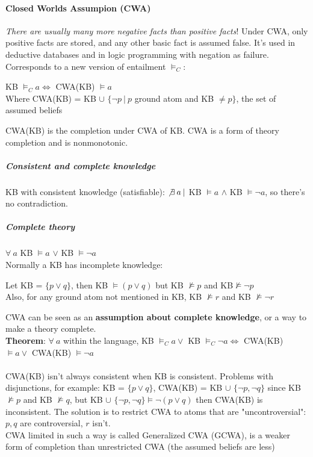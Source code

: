 \documentclass[10pt]{report}
\begin{document}
\paragraph{Closed Worlds Assumpion (CWA)} \textit{There are usually many more negative facts than positive facts}! Under CWA, only positive facts are stored, and any other basic fact is assumed false. It's used in deductive databases and in logic programming with negation as failure. Corresponds to a new version of entailment $\vDash_C$:
\begin{list}{}{}
	\item KB $\vDash_C a \Leftrightarrow$ CWA(KB) $\vDash a$\\
	Where CWA(KB) = KB $\cup$ $\{\neg p\:|\:p$ ground atom and KB $\neq p\}$, the set of assumed beliefs\\
\end{list}
CWA(KB) is the completion under CWA of KB. CWA is a form of theory completion and is nonmonotonic.
\subparagraph{Consistent and complete knowledge} KB with consistent knowledge (satisfiable): $\not\exists\:a\:|$ KB $\vDash a$ $\wedge$ KB $\vDash\neg a$, so there's no contradiction.
\subparagraph{Complete theory} $\forall\:a$ KB $\vDash a$ $\vee$ KB $\vDash\neg a$\\
Normally a KB has incomplete knowledge:
\begin{list}{}{}
	\item Let KB = $\{p\vee q\}$, then KB $\vDash (p\vee q)$ but KB $\not\vDash p$ and KB$\not\vDash \neg p$\\
	Also, for any ground atom not mentioned in KB, KB $\not\vDash r$ and KB $\not\vDash \neg r$
\end{list}
CWA can be seen as an \textbf{assumption about complete knowledge}, or a way to make a theory complete.\\
\textbf{Theorem}: $\forall\:a$ within the language, KB $\vDash_C a\vee$ KB $\vDash_C\neg a \Leftrightarrow$ CWA(KB) $\vDash a\vee$ CWA(KB) $\vDash\neg a$\\\\
CWA(KB) isn't always consistent when KB is consistent. Problems with disjunctions, for example: KB = $\{p\vee q\}$, CWA(KB) = KB $\cup$ $\{\neg p, \neg q\}$ since KB $\not\vDash p$ and KB $\not\vDash q$, but KB $\cup$ $ \{\neg p, \neg q\}\vDash \neg(p\vee q)$ then CWA(KB) is inconsistent. The solution is to restrict CWA to atoms that are "uncontroversial": $p,q$ are controversial, $r$ isn't.\\
CWA limited in such a way is called Generalized CWA (GCWA), is a weaker form of completion than unrestricted CWA (the assumed beliefs are less)
\end{document}
